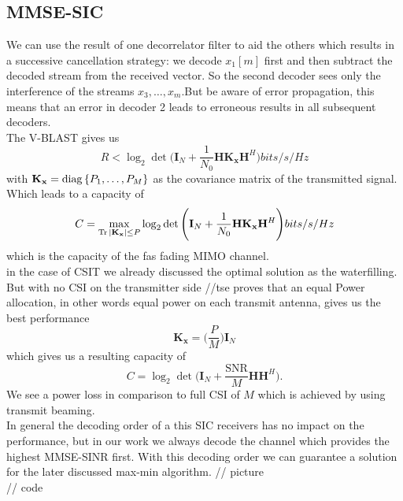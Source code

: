\subsection{MMSE-SIC}
We can use the result of one decorrelator filter to aid the others which results in a successive cancellation strategy: we decode $x_1[m]$ first and then subtract the decoded stream from the received vector. So the second decoder sees only the interference of the streams $x_3,\dots,x_m$.But be aware of error propagation, this means that an error in decoder 2 leads to erroneous results in all subsequent decoders.\\
The V-BLAST gives us
\begin{equation}
	R<\log_2{\det{\Biggr(\mathbf{I}_N+\frac{1}{N_0}\mathbf{H}\mathbf{K_x}\mathbf{H}^H\Biggl)}} bits/s/Hz
\end{equation}
with $\mathbf{K_x} = \mathrm{diag}\left\lbrace P_1,\dots,P_M\right\rbrace$ as the covariance matrix of the transmitted signal. Which leads to a capacity of
\begin{equation}
	C = \max_{\operatorname*{Tr}{|\mathbf{K_x}|}\leq P}{\log_2{\det{\Biggr(\mathbf{I}_N+\frac{1}{N_0}\mathbf{H}\mathbf{K_x}\mathbf{H}^H\Biggl)}}} bits/s/Hz
\end{equation}
which is the capacity of the fas fading MIMO channel.\\
in the case of CSIT we already discussed the optimal solution as the waterfilling. But with no CSI on the transmitter side //tse proves that an equal Power allocation, in other words equal power on each transmit antenna, gives us the best performance
\begin{equation}
	\mathbf{K_x} = \Biggr(\frac{P}{M}\Biggl)\mathbf{I}_N
\end{equation}
which gives us a resulting capacity of
\begin{equation}
	C =\log_2{\det{\Biggr(\mathbf{I}_N+\frac{
	\text{SNR}}{M}\mathbf{HH}^H\Biggl)}}.
\end{equation}
We see a power loss in comparison to full CSI of $M$ which is achieved by using transmit beaming.\\
In general the decoding order of a this SIC receivers has no impact on the performance, but in our work we always decode the channel which provides the highest MMSE-SINR first. With this decoding order we can guarantee a solution for the later discussed max-min algorithm.
// picture\\
// code